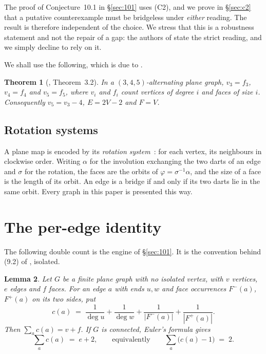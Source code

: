 \documentclass[11pt,a4paper]{amsart}
\theoremstyle{plain}
\newtheorem{theorem}{Theorem}[section]
\newtheorem{lemma}[theorem]{Lemma}
\theoremstyle{definition}
\begin{document}
The proof of Conjecture~10.1 in \S\ref{sec:101} uses (C2), and we prove in
\S\ref{sec:c2} that a putative counterexample must be bridgeless under
\emph{either} reading. The result is therefore independent of the choice. We
stress that this is a robustness statement and not the repair of a gap: the
authors of \cite{AHSSV2015} state the strict reading, and we simply decline to
rely on it.

We shall use the following, which is due to \cite{AHSSV2015}.

\begin{theorem}[\cite{AHSSV2015}, Theorem~3.2]\label{thm:32}
In a $(3,4,5)$-alternating plane graph, $v_3 = f_3$, $v_4 = f_4$ and
$v_5 = f_5$, where $v_i$ and $f_i$ count vertices of degree $i$ and faces of
size $i$. Consequently $v_5 = v_3 - 4$, $E = 2V - 2$ and $F = V$.
\end{theorem}

\subsection{Rotation systems}

A plane map is encoded by its \emph{rotation system}~\cite{MoharThomassen}: for each vertex, its
neighbours in clockwise order. Writing $\alpha$ for the involution exchanging
the two darts of an edge and $\sigma$ for the rotation, the faces are the orbits
of $\varphi = \sigma^{-1}\alpha$, and the size of a face is the length of its
orbit. An edge is a bridge if and only if its two darts lie in the same orbit.
Every graph in this paper is presented this way.

\section{The per-edge identity}\label{sec:identity}

The following double count is the engine of \S\ref{sec:101}. It is the
convention behind (9.2) of \cite{AHSSV2015}, isolated.

\begin{lemma}\label{lem:identity}
Let $G$ be a finite plane graph with no isolated vertex, with $v$ vertices,
$e$ edges and $f$ faces. For an edge
$a$ with ends $u,w$ and face occurrences $F^-(a)$, $F^+(a)$ on its two sides,
put
\[
  c(a) \;=\; \frac{1}{\deg u} + \frac{1}{\deg w}
           + \frac{1}{|F^-(a)|} + \frac{1}{|F^+(a)|}.
\]
Then $\sum_{a} c(a) = v + f$. If $G$ is connected, Euler's formula gives
\[
  \sum_{a} c(a) \;=\; e + 2 ,
  \qquad\text{equivalently}\qquad
  \sum_{a} \bigl(c(a) - 1\bigr) \;=\; 2 .
\]
\end{lemma}
\end{document}
